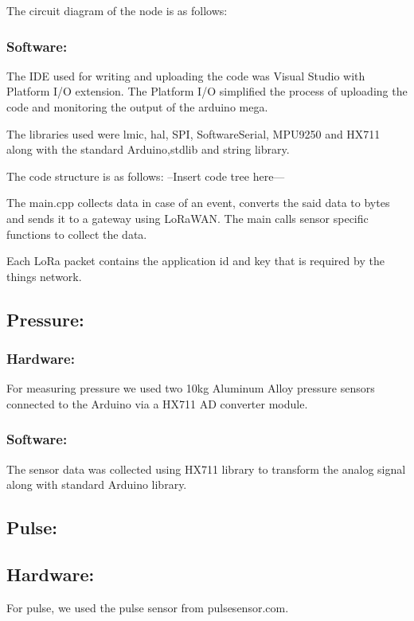 The circuit diagram of the node is as follows:



\subsubsection{Software:}
The IDE used for writing and uploading the code was Visual Studio with Platform I/O extension. The Platform I/O simplified the process of uploading the code and monitoring the output of the arduino mega.

The libraries used were lmic, hal, SPI, SoftwareSerial, MPU9250 and HX711 along with the standard Arduino,stdlib and string library.

The code structure is as follows:
--Insert code tree here---

The main.cpp collects data in case of an event, converts the said data to bytes and sends it to a gateway using LoRaWAN. The main calls sensor specific functions to collect the data. 

Each LoRa packet contains the application id and key that is required by the things network.

\subsection{Pressure:}

\subsubsection{Hardware:}
For measuring pressure we used two 10kg Aluminum Alloy pressure sensors connected to the Arduino via a HX711 AD converter module. 

\subsubsection{Software:}
The sensor data was collected using HX711 library to transform the analog signal along with standard Arduino library. 

\subsection{Pulse:}


\subsection{Hardware:}
For pulse, we used the pulse sensor from pulsesensor.com.


